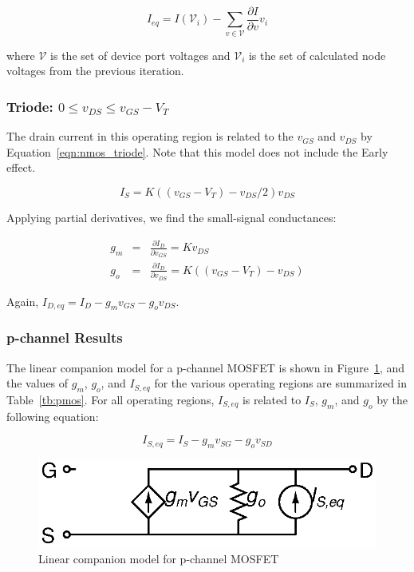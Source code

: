 \documentclass{article}
\begin{document}
\begin{equation}
\label{eqn:bias_current}
I_{eq}=I(\mathcal{V}_i)-\sum_{v \in \mathcal{V}}\frac{\partial I}{\partial v}v_i
\end{equation}

where $\mathcal{V}$ is the set of device port voltages and $\mathcal{V}_i$ is the set of calculated node voltages from the previous iteration.

\subsubsection{Triode: $ 0 \leq v_{DS} \leq v_{GS}-V_T $}

The drain current in this operating region is related to the $v_{GS}$ and $v_{DS}$ by Equation~\ref{eqn:nmos_triode}.  Note that this model does not include the Early effect.

\begin{equation}
\label{eqn:nmos_triode}
I_S=K((v_{GS}-V_T)-v_{DS}/2)v_{DS}
\end{equation}

Applying partial derivatives, we find the small-signal conductances:

\begin{eqnarray}
g_m&=&\frac{\partial I_D}{\partial v_{GS}}=Kv_{DS} \\
g_o&=&\frac{\partial I_D}{\partial v_{DS}}=K((v_{GS}-V_T)-v_{DS})
\end{eqnarray}

Again, $I_{D,eq}=I_D-g_mv_{GS}-g_ov_{DS}$.

\pagebreak

\subsubsection{p-channel Results}

The linear companion model for a p-channel MOSFET is shown in Figure~\ref{fig:pmos}, and the values of $g_m$, $g_o$, and $I_{S,eq}$ for the various operating regions are summarized in Table~\ref{tb:pmos}.  For all operating regions, $I_{S,eq}$ is related to $I_S$, $g_m$, and $g_o$ by the following equation:

\begin{equation}
I_{S,eq} =  I_S - g_m v_{SG} - g_o v_{SD}
\end{equation}

\begin{figure}[h]
\begin{center}
\includegraphics{fig/pmos.eps}
\caption{Linear companion model for p-channel MOSFET \label{fig:pmos}}
\end{center}
\end{figure}
\end{document}
